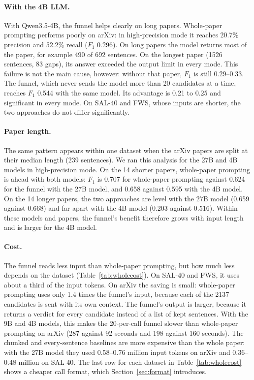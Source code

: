 \paragraph{With the 4B LLM.} With Qwen3.5-4B, the funnel helps clearly on long papers. Whole-paper prompting performs poorly on arXiv: in high-precision mode it reaches 20.7\% precision and 52.2\% recall ($F_1$ 0.296). On long papers the model returns most of the paper, for example 490 of 692 sentences. On the longest paper (1526 sentences, 83 gaps), its answer exceeded the output limit in every mode. This failure is not the main cause, however: without that paper, $F_1$ is still 0.29--0.33. The funnel, which never sends the model more than 20 candidates at a time, reaches $F_1$ 0.544 with the same model. Its advantage is 0.21 to 0.25 and significant in every mode. On SAL-40 and FWS, whose inputs are shorter, the two approaches do not differ significantly.

\paragraph{Paper length.} The same pattern appears within one dataset when the arXiv papers are split at their median length (239 sentences). We ran this analysis for the 27B and 4B models in high-precision mode. On the 14 shorter papers, whole-paper prompting is ahead with both models: $F_1$ is 0.707 for whole-paper prompting against 0.624 for the funnel with the 27B model, and 0.658 against 0.595 with the 4B model. On the 14 longer papers, the two approaches are level with the 27B model (0.659 against 0.668) and far apart with the 4B model (0.203 against 0.516). Within these models and papers, the funnel's benefit therefore grows with input length and is larger for the 4B model.

\paragraph{Cost.} The funnel reads less input than whole-paper prompting, but how much less depends on the dataset (Table~\ref{tab:wholecost}). On SAL-40 and FWS, it uses about a third of the input tokens. On arXiv the saving is small: whole-paper prompting uses only 1.4 times the funnel's input, because each of the 2137 candidates is sent with its own context. The funnel's output is larger, because it returns a verdict for every candidate instead of a list of kept sentences. With the 9B and 4B models, this makes the 20-per-call funnel slower than whole-paper prompting on arXiv (287 against 92 seconds and 198 against 160 seconds). The chunked and every-sentence baselines are more expensive than the whole paper: with the 27B model they used 0.58--0.76 million input tokens on arXiv and 0.36--0.48 million on SAL-40. The last row for each dataset in Table~\ref{tab:wholecost} shows a cheaper call format, which Section~\ref{sec:format} introduces.

